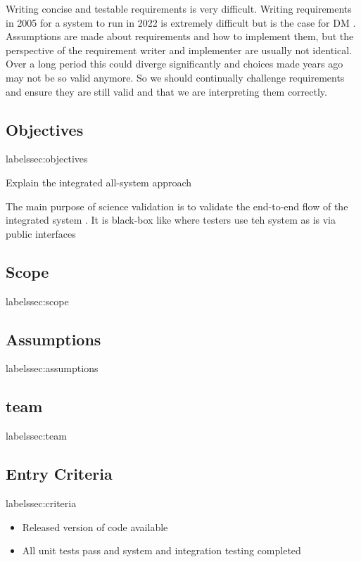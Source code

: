 
Writing concise and testable requirements is very difficult. Writing requirements in 2005 for
a system to run in 2022 is extremely difficult but is the case for  DM  . Assumptions are made
about requirements and how to implement them, but the perspective of the requirement
writer and implementer are usually not identical. Over a long period this could diverge significantly and choices made years ago may not be so valid anymore. So we should continually
challenge requirements and ensure they are still valid and that we are interpreting them correctly.

\subsection{Objectives}   label{ssec:objectives} 

Explain the integrated all-system approach 

The main purpose of science validation is to validate the end-to-end flow of the integrated system . It is black-box like where testers use teh system as is via public interfaces 

\subsection{Scope}   label{ssec:scope}

\subsection{Assumptions}   label{ssec:assumptions }


\subsection{team}   label{ssec:team}


\subsection{Entry Criteria}   label{ssec:criteria}

\begin{itemize}
\item Released version of code available 
\item All unit tests pass and system and integration testing completed
\end{itemize}

